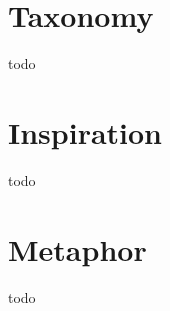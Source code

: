 \documentclass[a4paper, 11pt]{article}
\begin{document}
\section{Taxonomy}
\label{sec:taxonomy}
todo

\section{Inspiration}
\label{sec:inspiration}
todo

\section{Metaphor}
\label{sec:metaphor}
todo
\end{document}
